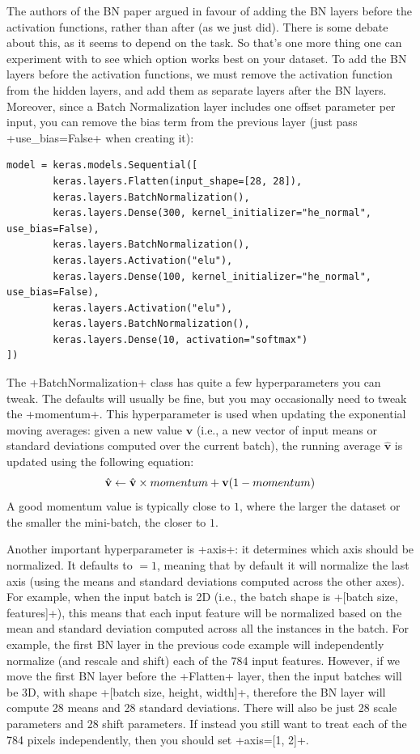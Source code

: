 The authors of the BN paper argued in favour of adding the BN layers before the activation functions, rather than after (as we just did). There is some debate about this, as it seems to depend on the task. So that's one more thing one can experiment with to see which option works best on your dataset. To add the BN layers before the activation functions, we must remove the activation function from the hidden layers, and add them as separate layers after the BN layers. Moreover, since a Batch Normalization layer includes one offset parameter per input, you can remove the bias term from the previous layer (just pass \cd+use_bias=False+ when creating it):
\begin{lstlisting}
model = keras.models.Sequential([
        keras.layers.Flatten(input_shape=[28, 28]),
        keras.layers.BatchNormalization(),
        keras.layers.Dense(300, kernel_initializer="he_normal", use_bias=False),
        keras.layers.BatchNormalization(),
        keras.layers.Activation("elu"),
        keras.layers.Dense(100, kernel_initializer="he_normal", use_bias=False),
        keras.layers.Activation("elu"),
        keras.layers.BatchNormalization(),
        keras.layers.Dense(10, activation="softmax")
])
\end{lstlisting}
The \cd+BatchNormalization+ class has quite a few hyperparameters you can tweak. The defaults will usually be fine, but you may occasionally need to tweak the \cd+momentum+. This hyperparameter is used when updating the exponential moving averages: given a new value $\mathbf{v}$ (i.e., a new vector of input means or standard deviations computed over the current batch), the running average $\hat{\mathbf{v}}$ is updated using the following equation:
\begin{equation}
\hat{\mathbf{v}} \leftarrow \hat{\mathbf{v}} \times momentum + \mathbf{v} \br{1-momentum}
\end{equation}
A good momentum value is typically close to $1$, where the larger the dataset or the smaller the mini-batch, the closer to $1$.

Another important hyperparameter is \cd+axis+: it determines which axis should be normalized. It defaults to $=1$, meaning that by default it will normalize the last axis (using the means and standard deviations computed across the other axes). For example, when the input batch is 2D (i.e., the batch shape is \cd+[batch size, features]+), this means that each input feature will be normalized based on the mean and standard deviation computed across all the instances in the batch. For example, the first BN layer in the previous code example will independently normalize (and rescale and shift) each of the 784 input features. However, if we move the first BN layer before the \cd+Flatten+ layer, then the input batches will be 3D, with shape \cd+[batch size, height, width]+, therefore the BN layer will compute 28 means and 28 standard deviations. There will also be just 28 scale parameters and 28 shift parameters. If instead you still want to treat each of the 784 pixels independently, then you should set \cd+axis=[1, 2]+.

